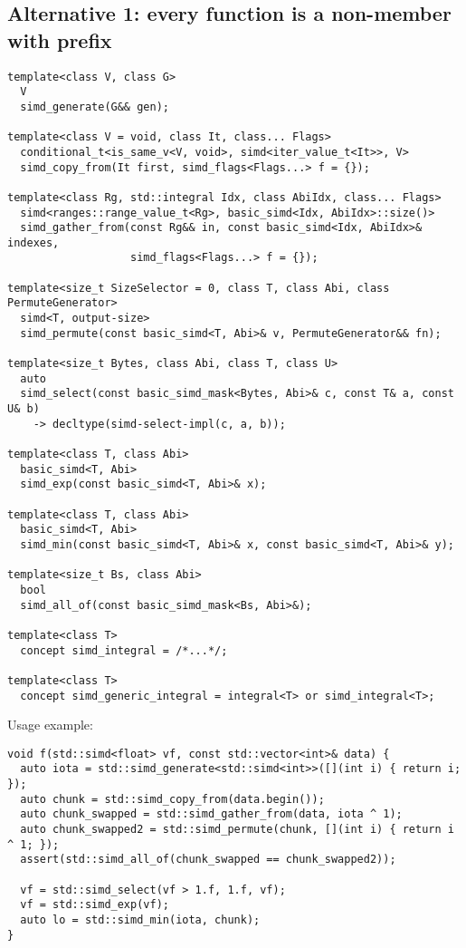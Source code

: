 \subsection{Alternative 1: every function is a non-member with  prefix}

\medskip\begin{lstlisting}[style=Vc]
template<class V, class G>
  V
  simd_generate(G&& gen);

template<class V = void, class It, class... Flags>
  conditional_t<is_same_v<V, void>, simd<iter_value_t<It>>, V>
  simd_copy_from(It first, simd_flags<Flags...> f = {});

template<class Rg, std::integral Idx, class AbiIdx, class... Flags>
  simd<ranges::range_value_t<Rg>, basic_simd<Idx, AbiIdx>::size()>
  simd_gather_from(const Rg&& in, const basic_simd<Idx, AbiIdx>& indexes,
                   simd_flags<Flags...> f = {});

template<size_t SizeSelector = 0, class T, class Abi, class PermuteGenerator>
  simd<T, output-size>
  simd_permute(const basic_simd<T, Abi>& v, PermuteGenerator&& fn);

template<size_t Bytes, class Abi, class T, class U>
  auto
  simd_select(const basic_simd_mask<Bytes, Abi>& c, const T& a, const U& b)
    -> decltype(simd-select-impl(c, a, b));

template<class T, class Abi>
  basic_simd<T, Abi>
  simd_exp(const basic_simd<T, Abi>& x);

template<class T, class Abi>
  basic_simd<T, Abi>
  simd_min(const basic_simd<T, Abi>& x, const basic_simd<T, Abi>& y);

template<size_t Bs, class Abi>
  bool
  simd_all_of(const basic_simd_mask<Bs, Abi>&);

template<class T>
  concept simd_integral = /*...*/;

template<class T>
  concept simd_generic_integral = integral<T> or simd_integral<T>;
\end{lstlisting}

Usage example:
\medskip\begin{lstlisting}[style=Vc]
void f(std::simd<float> vf, const std::vector<int>& data) {
  auto iota = std::simd_generate<std::simd<int>>([](int i) { return i; });
  auto chunk = std::simd_copy_from(data.begin());
  auto chunk_swapped = std::simd_gather_from(data, iota ^ 1);
  auto chunk_swapped2 = std::simd_permute(chunk, [](int i) { return i ^ 1; });
  assert(std::simd_all_of(chunk_swapped == chunk_swapped2));

  vf = std::simd_select(vf > 1.f, 1.f, vf);
  vf = std::simd_exp(vf);
  auto lo = std::simd_min(iota, chunk);
}
\end{lstlisting}

